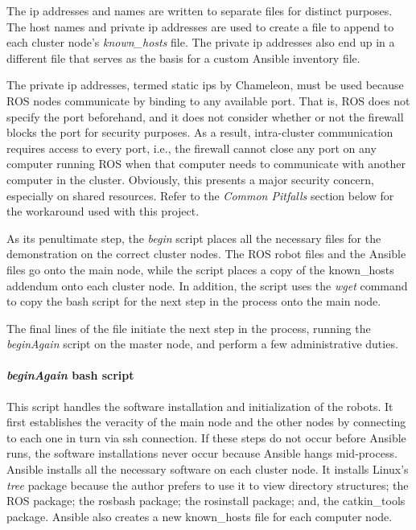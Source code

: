 \documentclass[9pt,twocolumn,twoside]{../../styles/osajnl}
\begin{document}
The ip addresses and names are written to separate files for distinct purposes.  The host names and private ip addresses are used to create a file to append to each cluster node's \textit{known\_hosts} file.  The private ip addresses also end up in a different file that serves as the basis for a custom Ansible inventory file.  

The private ip addresses, termed static ips by Chameleon, must be used because ROS nodes communicate by binding to any available port.  That is, ROS does not specify the port beforehand, and it does not consider whether or not the firewall blocks the port for security purposes.  As a result, intra-cluster communication requires access to every port, i.e., the firewall cannot close any port on any computer running ROS when that computer needs to communicate with another computer in the cluster.  Obviously, this presents a major security concern, especially on shared resources. Refer to the \textit{Common Pitfalls} section below for the workaround used with this project.

As its penultimate step, the \textit{begin} script places all the necessary files for the demonstration on the correct cluster nodes.  The ROS robot files and the Ansible files go onto the main node, while the script places a copy of the known\_hosts addendum onto each cluster node.  In addition, the script uses the \textit{wget} command to copy the bash script for the next step in the process onto the main node.

The final lines of the file initiate the next step in the process, running the \textit{beginAgain} script on the master node, and perform a few administrative duties.

\paragraph{\textit{beginAgain} bash script}
This script handles the software installation and initialization of the robots.  It first establishes the veracity of the main node and the other nodes by connecting to each one in turn via ssh connection.  If these steps do not occur before Ansible runs, the software installations never occur because Ansible hangs mid-process.  Ansible installs all the necessary software on each cluster node.  It installs Linux's \textit{tree} package because the author prefers to use it to view directory structures; the ROS package; the rosbash package; the rosinstall package; and, the catkin\_tools package. Ansible also creates a new known\_hosts file for each computer node.
\end{document}
